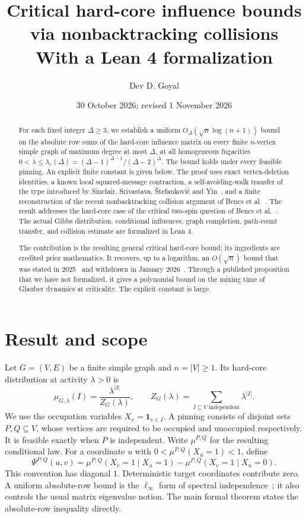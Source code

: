 \documentclass[11pt]{article}
\title{\textbf{Critical hard-core influence bounds\\via nonbacktracking collisions}\\[6pt]
\large With a Lean 4 formalization}
\author{Dev D. Goyal}
\date{30 October 2026; revised 1 November 2026}
\theoremstyle{definition}
\newcommand{\lamc}{\lambda_{\mathrm c}}
\begin{document}
\maketitle

\begin{abstract}
For each fixed integer $\Delta\ge3$, we establish a uniform
$O_\Delta(\sqrt n\log(n+1))$ bound on the absolute row sums of the hard-core
influence matrix on every finite $n$-vertex simple graph of maximum degree
at most $\Delta$, at all homogeneous fugacities
$0<\lambda\le\lamc(\Delta)=(\Delta-1)^{\Delta-1}/(\Delta-2)^\Delta$.
The bound holds under every feasible pinning. An explicit finite constant
is given below. The proof uses exact vertex-deletion identities, a known
local squared-message contraction, a self-avoiding-walk transfer of the
type introduced by Sinclair, Srivastava, \v{S}tefankovi\v{c} and
Yin~\cite{SSSY}, and a finite reconstruction of the recent nonbacktracking
collision argument of Bencs et al.~\cite{Bencs}. The result addresses the
hard-core case of the critical two-spin question of Bencs et
al.~\cite[Section~5]{Bencs}. The actual Gibbs distribution, conditional
influences, graph completion, path-count transfer, and collision estimate are
formalized in Lean 4.

The contribution is the resulting general critical hard-core bound;
its ingredients are credited prior mathematics. It recovers, up to a
logarithm, an $O(\sqrt n)$ bound that was stated in 2025~\cite{CJ25} and
withdrawn in January 2026~\cite{CJ26}. Through a published proposition that we have not formalized,
it gives a polynomial bound on the mixing time of Glauber dynamics at
criticality. The explicit constant is large.
\end{abstract}

\section{Result and scope}

Let $G=(V,E)$ be a finite simple graph and $n=|V|\ge1$. Its hard-core
distribution at activity $\lambda>0$ is
\[
 \mu_{G,\lambda}(I)=\frac{\lambda^{|I|}}{Z_G(\lambda)},\qquad
 Z_G(\lambda)=\sum_{I\subseteq V\text{ independent}}\lambda^{|I|}.
\]
We use the occupation variables $X_v=\boldsymbol1_{v\in I}$.
A pinning consists of disjoint sets $P,Q\subseteq V$, whose vertices are
required to be occupied and unoccupied respectively. It is feasible exactly
when $P$ is independent. Write $\mu^{P,Q}$ for the resulting conditional law.
For a coordinate $u$ with $0<\mu^{P,Q}(X_u=1)<1$, define
\[
 \Psi^{P,Q}(u,v)=
 \mu^{P,Q}(X_v=1\mid X_u=1)-
 \mu^{P,Q}(X_v=1\mid X_u=0).
\]
This convention has diagonal $1$. Deterministic target coordinates
contribute zero. A uniform absolute-row bound is the
$\ell_\infty$ form of spectral independence~\cite{ALO}; it also controls the usual
matrix eigenvalue notion. The main formal theorem states the absolute-row
inequality directly.
\end{document}

